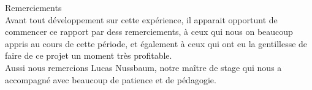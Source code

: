 \newline
\newline
\newline
\newline
\newline
\newline
\newline
\begin{center}
Remerciements
\\
Avant tout développement sur cette expérience, il apparait opportunt de commencer ce rapport par dess remerciements, à ceux qui nous on beaucoup appris au cours de cette période, et également à ceux qui ont eu la gentillesse de faire de ce projet un moment très profitable.\\
Aussi nous remercions Lucas Nussbaum, notre maître de stage qui nous a accompagné avec beaucoup de patience et de pédagogie. 
\end{center}
